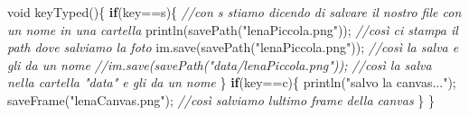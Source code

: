 \documentclass[
]{article}
\newenvironment{Shaded}{}{}
\newcommand{\CharTok}[1]{\textcolor[rgb]{0.25,0.44,0.63}{#1}}
\newcommand{\CommentTok}[1]{\textcolor[rgb]{0.38,0.63,0.69}{\textit{#1}}}
\newcommand{\ControlFlowTok}[1]{\textcolor[rgb]{0.00,0.44,0.13}{\textbf{#1}}}
\newcommand{\DataTypeTok}[1]{\textcolor[rgb]{0.56,0.13,0.00}{#1}}
\newcommand{\FunctionTok}[1]{\textcolor[rgb]{0.02,0.16,0.49}{#1}}
\newcommand{\NormalTok}[1]{#1}
\newcommand{\OperatorTok}[1]{\textcolor[rgb]{0.40,0.40,0.40}{#1}}
\newcommand{\StringTok}[1]{\textcolor[rgb]{0.25,0.44,0.63}{#1}}
\begin{document}
\begin{Shaded}
\begin{Highlighting}[]
\DataTypeTok{void} \FunctionTok{keyTyped}\OperatorTok{()\{}
  \ControlFlowTok{if}\OperatorTok{(}\NormalTok{key}\OperatorTok{==}\CharTok{\textquotesingle{}s\textquotesingle{}}\OperatorTok{)\{} \CommentTok{//con s stiamo dicendo di salvare il nostro file con un nome in una cartella}
    \FunctionTok{println}\OperatorTok{(}\FunctionTok{savePath}\OperatorTok{(}\StringTok{"lenaPiccola.png"}\OperatorTok{));} \CommentTok{//così ci stampa il path dove salviamo la foto}
\NormalTok{    im}\OperatorTok{.}\FunctionTok{save}\OperatorTok{(}\FunctionTok{savePath}\OperatorTok{(}\StringTok{"lenaPiccola.png"}\OperatorTok{));} \CommentTok{//così la salva e gli da un nome}
    \CommentTok{//im.save(savePath("data/lenaPiccola.png")); //così la salva nella cartella "data" e gli da un nome}
  \OperatorTok{\}}
  \ControlFlowTok{if}\OperatorTok{(}\NormalTok{key}\OperatorTok{==}\CharTok{\textquotesingle{}c\textquotesingle{}}\OperatorTok{)\{}
  \FunctionTok{println}\OperatorTok{(}\StringTok{"salvo la canvas..."}\OperatorTok{);}
  \FunctionTok{saveFrame}\OperatorTok{(}\StringTok{"lenaCanvas.png"}\OperatorTok{);} \CommentTok{//così salviamo l\textquotesingle{}ultimo frame della canvas}
  \OperatorTok{\}}
\OperatorTok{\}}
\end{Highlighting}
\end{Shaded}
\end{document}
